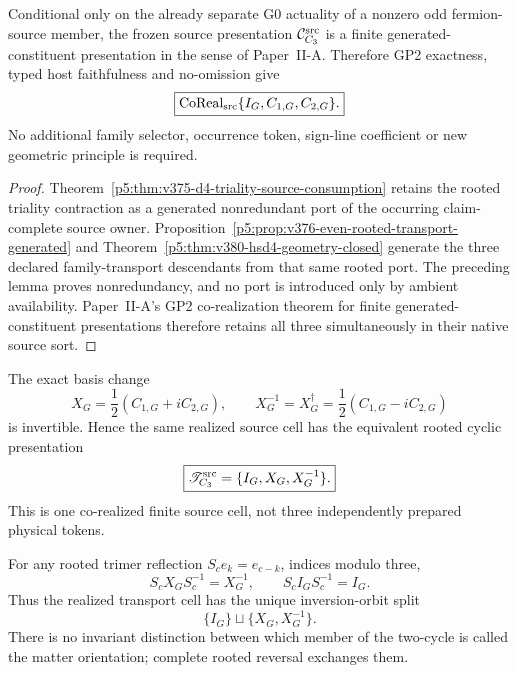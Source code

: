 \documentclass[12pt,a4paper]{article}
\begin{document}
\begin{theorem}
\label{p5:thm:v381-c3-source-cell-corealization}
Conditional only on the already separate G0 actuality of a nonzero odd
fermion-source member, the frozen source presentation
\(\mathcal C_{C_3}^{\rm src}\) is a finite generated-constituent
presentation in the sense of Paper~II-A.  Therefore GP2 exactness, typed host
faithfulness and no-omission give
\[
 \boxed{\operatorname{CoReal}_{\rm src}
 \{I_G,C_{1,G},C_{2,G}\}.}
\]
No additional family selector, occurrence token, sign-line coefficient or
new geometric principle is required.
\end{theorem}
\begin{proof}
Theorem~\ref{p5:thm:v375-d4-triality-source-consumption} retains the rooted
triality contraction as a generated nonredundant port of the occurring
claim-complete source owner.  Proposition~\ref{p5:prop:v376-even-rooted-transport-generated}
and Theorem~\ref{p5:thm:v380-hsd4-geometry-closed} generate the three declared
family-transport descendants from that same rooted port.  The preceding lemma
proves nonredundancy, and no port is introduced only by ambient availability.
Paper~II-A's GP2 co-realization theorem for finite generated-constituent
presentations therefore retains all three simultaneously in their native
source sort.
\end{proof}

\begin{corollary}
\label{p5:cor:v381-c3-transport-presentation}
The exact basis change
\[
 X_G=\frac12(C_{1,G}+iC_{2,G}),
 \qquad
 X_G^{-1}=X_G^\dagger=\frac12(C_{1,G}-iC_{2,G})
\]
is invertible.  Hence the same realized source cell has the equivalent rooted
cyclic presentation
\[
 \boxed{\mathscr T_{C_3}^{\rm src}=\{I_G,X_G,X_G^{-1}\}.}
\]
This is one co-realized finite source cell, not three independently prepared
physical tokens.
\end{corollary}

\begin{corollary}
\label{p5:cor:v381-c3-conjugation-orbit}
For any rooted trimer reflection \(S_c e_k=e_{c-k}\), indices modulo three,
\[
 S_cX_GS_c^{-1}=X_G^{-1},
 \qquad
 S_cI_GS_c^{-1}=I_G.
\]
Thus the realized transport cell has the unique inversion-orbit split
\[
 \boxed{\{I_G\}\sqcup\{X_G,X_G^{-1}\}.}
\]
There is no invariant distinction between which member of the two-cycle is
called the matter orientation; complete rooted reversal exchanges them.
\end{corollary}
\end{document}
